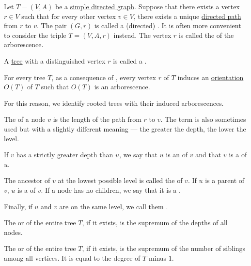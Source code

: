\begin{definition}\label{def:arborescence}
  Let \( T = (V, A) \) be a \hyperref[def:quiver/simple]{simple directed graph}. Suppose that there exists a vertex \( r \in V \) such that for every other vertex \( v \in V \), there exists a unique \hyperref[def:quiver_path/directed]{directed path} from \( r \) to \( v \). The pair \( (G, r) \) is called a (directed) . It is often more convenient to consider the triple \( T = (V, A, r) \) instead. The vertex \( r \) is called the  of the arborescence.

  \begin{thmenum}
     A \hyperref[def:tree]{tree} with a distinguished vertex \( r \) is called a .

    For every tree \( T \), as a consequence of , every vertex \( r \) of \( T \) induces an \hyperref[def:multigraph_orientation]{orientation} \( O(T) \) of \( T \) such that \( O(T) \) is an arborescence.

    For this reason, we identify rooted trees with their induced arborescences.

     The  of a node \( v \) is the length of the path from \( r \) to \( v \). The term  is also sometimes used but with a slightly different meaning --- the greater the depth, the lower the level.

     If \( v \) has a strictly greater depth than \( u \), we say that \( u \) is an  of \( v \) and that \( v \) is a  of \( u \).

    The ancestor of \( v \) at the lowest possible level is called the  of \( v \). If \( u \) is a parent of \( v \), \( u \) is a  of \( v \). If a node has no children, we say that it is a .

    Finally, if \( u \) and \( v \) are on the same level, we call them .

     The  or  of the entire tree \( T \), if it exists, is the supremum of the depths of all nodes.

     The  or  of the entire tree \( T \), if it exists, is the supremum of the number of siblings among all vertices. It is equal to the degree of \( T \) minus \( 1 \).


\end{thmenum}
\end{definition}
